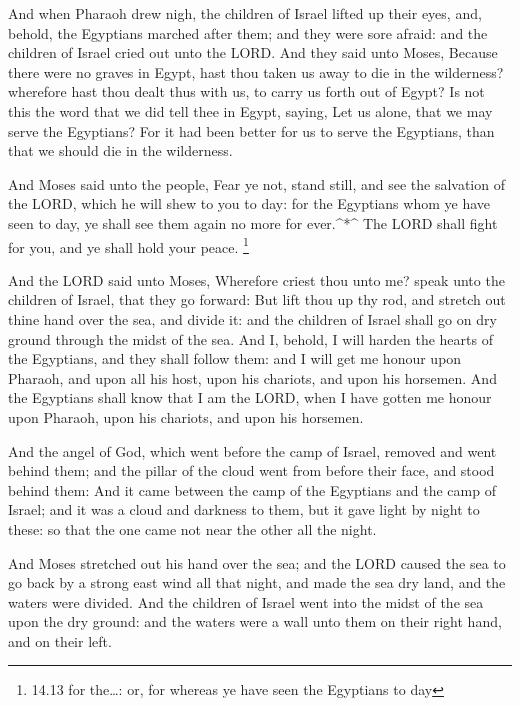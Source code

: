  And when Pharaoh drew nigh, the children of Israel lifted
up their eyes, and, behold, the Egyptians marched after them; and they
were sore afraid: and the children of Israel cried out unto the LORD.
 And they said unto Moses, Because there were no graves in
Egypt, hast thou taken us away to die in the wilderness? wherefore hast
thou dealt thus with us, to carry us forth out of Egypt? 
Is not this the word that we did tell thee in Egypt, saying, Let us
alone, that we may serve the Egyptians? For it had been better for us to
serve the Egyptians, than that we should die in the wilderness.

 And Moses said unto the people, Fear ye not, stand still,
and see the salvation of the LORD, which he will shew to you to day: for
the Egyptians whom ye have seen to day, ye shall see them again no more
for ever.\^{}*\^{}  The LORD shall fight for you, and ye
shall hold your peace. \footnote{14.13 for the\ldots: or, for whereas ye
  have seen the Egyptians to day}

 And the LORD said unto Moses, Wherefore criest thou unto
me? speak unto the children of Israel, that they go forward:
 But lift thou up thy rod, and stretch out thine hand over
the sea, and divide it: and the children of Israel shall go on dry
ground through the midst of the sea.  And I, behold, I will
harden the hearts of the Egyptians, and they shall follow them: and I
will get me honour upon Pharaoh, and upon all his host, upon his
chariots, and upon his horsemen.  And the Egyptians shall
know that I am the LORD, when I have gotten me honour upon Pharaoh, upon
his chariots, and upon his horsemen.

 And the angel of God, which went before the camp of
Israel, removed and went behind them; and the pillar of the cloud went
from before their face, and stood behind them:  And it came
between the camp of the Egyptians and the camp of Israel; and it was a
cloud and darkness to them, but it gave light by night to these: so that
the one came not near the other all the night.

 And Moses stretched out his hand over the sea; and the
LORD caused the sea to go back by a strong east wind all that night, and
made the sea dry land, and the waters were divided.  And
the children of Israel went into the midst of the sea upon the dry
ground: and the waters were a wall unto them on their right hand, and on
their left.


